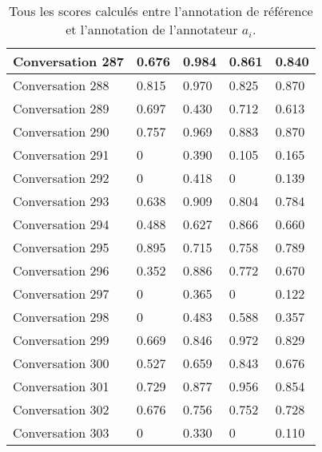 \begin{table}[]
\begin{tabular}{|l|l|l|l|l|}
Conversation 287 & 0.676    & 0.984 & 0.861       & 0.840   \\ \hline
Conversation 288 & 0.815    & 0.970 & 0.825       & 0.870   \\ \hline
Conversation 289 & 0.697    & 0.430 & 0.712       & 0.613   \\ \hline
Conversation 290 & 0.757    & 0.969 & 0.883       & 0.870   \\ \hline
Conversation 291 & 0        & 0.390 & 0.105       & 0.165   \\ \hline
Conversation 292 & 0        & 0.418 & 0           & 0.139   \\ \hline
Conversation 293 & 0.638    & 0.909 & 0.804       & 0.784   \\ \hline
Conversation 294 & 0.488    & 0.627 & 0.866       & 0.660   \\ \hline
Conversation 295 & 0.895    & 0.715 & 0.758       & 0.789   \\ \hline
Conversation 296 & 0.352    & 0.886 & 0.772       & 0.670   \\ \hline
Conversation 297 & 0        & 0.365 & 0           & 0.122   \\ \hline
Conversation 298 & 0        & 0.483 & 0.588       & 0.357   \\ \hline
Conversation 299 & 0.669    & 0.846 & 0.972       & 0.829   \\ \hline
Conversation 300 & 0.527    & 0.659 & 0.843       & 0.676   \\ \hline
Conversation 301 & 0.729    & 0.877 & 0.956       & 0.854   \\ \hline
Conversation 302 & 0.676    & 0.756 & 0.752       & 0.728   \\ \hline
Conversation 303 & 0        & 0.330 & 0           & 0.110   \\ \hline
\end{tabular}
\label{tab:tousScoresAnnotateurs}
\caption{Tous les scores calculés entre l'annotation de référence et l'annotation de l'annotateur $a_i$. }
\end{table}
